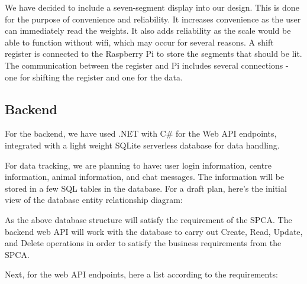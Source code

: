 We have decided to include a seven-segment display into our design. This is done for the purpose of convenience and reliability. It increases convenience as the user can immediately read the weights. It also adds reliability as the scale would be able to function without wifi, which may occur for several reasons. A shift register is connected to the Raspberry Pi to store the segments that should be lit. The communication between the register and Pi includes several connections - one for shifting the register and one for the data. 

\subsection{Backend}
For the backend, we have used .NET with C# for the Web API endpoints, integrated with a light weight SQLite serverless database for data handling. 

For data tracking, we are planning to have: user login information, centre information, animal information, and chat messages. The information will be stored in a few SQL tables in the database. For a draft plan, here's the initial view of the database entity relationship diagram:

As the above database structure will satisfy the requirement of the SPCA. The backend web API will work with the database to carry out Create, Read, Update, and Delete operations in order to satisfy the business requirements from the SPCA.

Next, for the web API endpoints, here a list according to the requirements:

